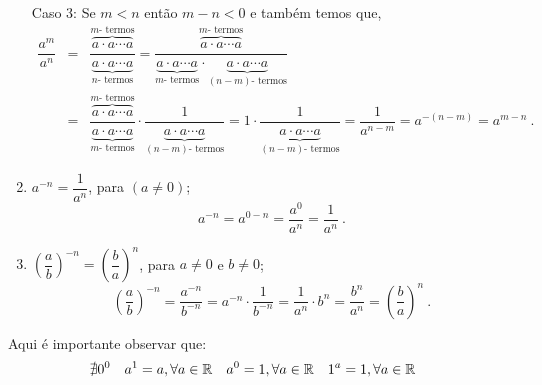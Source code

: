 \begin{enumerate}[P1)]
 Caso 3: Se $m < n$ então $m - n< 0$ e também temos que,
 \begin{eqnarray*}
  \dfrac{a^m}{a^n} &=&
 \dfrac{\overbrace{a \cdot a \cdots a}^{m \text{- termos}}}{\underbrace{a \cdot a \cdots a}_{n \text{- termos}}}=
 \dfrac{\overbrace{a \cdot a \cdots a}^{m \text{- termos}}}{\underbrace{a \cdot a \cdots a}_{m \text{- termos}} \cdot \underbrace{a \cdot a \cdots a}_{(n-m) \text{- termos}}} \\
 & = &\dfrac{\overbrace{a \cdot a \cdots a}^{m \text{- termos}}}{\underbrace{a \cdot a \cdots a}_{m \text{- termos}}} \cdot \dfrac{1}{\underbrace{a \cdot a \cdots a}_{(n-m) \text{- termos}}}=
 1 \cdot \dfrac{1}{\underbrace{a \cdot a \cdots a}_{(n-m) \text{- termos}}}= \dfrac{1}{a^{n-m}}= a^{-(n-m)}= a^{m-n} \ .
 \end{eqnarray*}


 \item $a^{-n}= \dfrac{1}{a^n}$, para $(a \neq 0)$;
 \[a^{-n}= a^{0-n}= \dfrac{a^0}{a^n}= \dfrac{1}{a^n} \ .\]

 \item $\left(\dfrac{a}{b} \right)^{-n}= \left(\dfrac{b}{a} \right)^{n}$, para $a \neq 0$ e $b \neq 0$;
 \[\left(\dfrac{a}{b} \right)^{-n}= \dfrac{a^{-n}}{b^{-n}}= a^{-n} \cdot \dfrac{1}{b^{-n}}= \dfrac{1}{a^n} \cdot b^{n}= \dfrac{b^n}{a^n}= \left(\dfrac{b}{a}\right)^n \ .\]

 \end{enumerate}

   \vskip0.3cm

 \colorbox{amarelo}{
 \begin{minipage}{0.9\linewidth}
 \begin{center}
 Aqui é importante observar que:
 \begin{align*}
 & \nexists 0^0 & & a^1= a, \forall a \in \mathbb{R} & & a^0= 1, \forall a \in \mathbb{R} & & 1^a= 1, \forall a \in \mathbb{R}
 \end{align*}
 \end{center}
 \end{minipage}}

\vskip0.3cm

